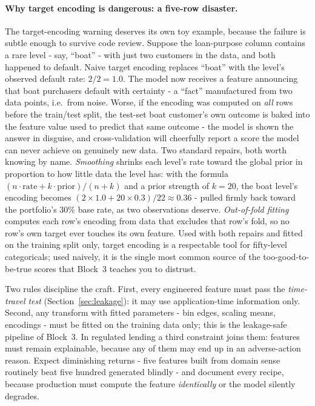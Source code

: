 \documentclass[11pt,a4paper]{article}
\begin{document}
\paragraph{Why target encoding is dangerous: a five-row disaster.} The
target-encoding warning deserves its own toy example, because the failure
is subtle enough to survive code review. Suppose the loan-purpose column
contains a rare level - say, ``boat'' - with just two customers in the
data, and both happened to default. Naive target encoding replaces
``boat'' with the level's observed default rate: $2/2 = 1.0$. The model
now receives a feature announcing that boat purchasers default with
certainty - a ``fact'' manufactured from two data points, i.e.\ from
noise. Worse, if the encoding was computed on \emph{all} rows before the
train/test split, the test-set boat customer's own outcome is baked into
the feature value used to predict that same outcome - the model is shown
the answer in disguise, and cross-validation will cheerfully report a
score the model can never achieve on genuinely new data. Two standard
repairs, both worth knowing by name. \emph{Smoothing} shrinks each
level's rate toward the global prior in proportion to how little data the
level has: with the formula
$(n \cdot \text{rate} + k \cdot \text{prior})/(n + k)$ and a prior
strength of $k=20$, the boat level's encoding becomes
$(2 \times 1.0 + 20 \times 0.3)/22 \approx 0.36$ - pulled firmly back
toward the portfolio's 30\% base rate, as two observations deserve.
\emph{Out-of-fold fitting} computes each row's encoding from data that
excludes that row's fold, so no row's own target ever touches its own
feature. Used with both repairs and fitted on the training split only,
target encoding is a respectable tool for fifty-level categoricals; used
naively, it is the single most common source of the too-good-to-be-true
scores that Block~3 teaches you to distrust.

Two rules discipline the craft. First, every engineered feature must pass
the \emph{time-travel test} (Section~\ref{sec:leakage}): it may use
application-time information only. Second, any transform with fitted
parameters - bin edges, scaling means, encodings - must be fitted on the
training data only; this is the leakage-safe pipeline of Block~3. In
regulated lending a third constraint joins them: features must remain
explainable, because any of them may end up in an adverse-action reason.
Expect diminishing returns - five features built from domain sense
routinely beat five hundred generated blindly - and document every recipe,
because production must compute the feature \emph{identically} or the model
silently degrades.
\end{document}
